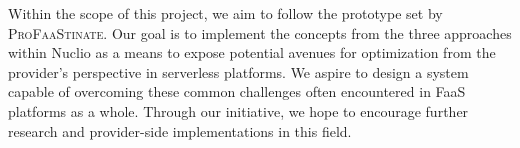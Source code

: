 
Within the scope of this project, we aim to follow the prototype set by
\textsc{ProFaaStinate}. Our goal is to implement the concepts from the three
approaches within Nuclio as a means to expose potential avenues for optimization
from the provider's perspective in serverless platforms. We aspire to design a
system capable of overcoming these common challenges often encountered in FaaS
platforms as a whole. Through our initiative, we hope to encourage further
research and provider-side implementations in this field.


